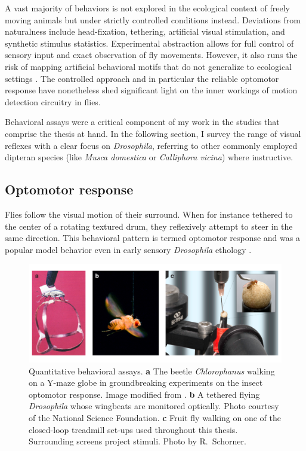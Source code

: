 A vast majority of behaviors is not explored in the ecological context of freely moving animals but under strictly controlled conditions instead. Deviations from naturalness include head-fixation, tethering, artificial visual stimulation, and synthetic stimulus statistics. Experimental abstraction allows for full control of sensory input and exact observation of fly movements. However, it also runs the risk of mapping artificial behavioral motifs that do not generalize to ecological settings \citep{Krakauer:2017aa}. The controlled approach and in particular the reliable optomotor response have nonetheless shed significant light on the inner workings of motion detection circuitry in flies.

Behavioral assays were a critical component of my work in the studies that comprise the thesis at hand. In the following section, I survey the range of visual reflexes with a clear focus on \textit{Drosophila}, referring to other commonly employed dipteran species (like \textit{Musca domestica} or \textit{Calliphora vicina}) where instructive.

\subsection{Optomotor response}
Flies follow the visual motion of their surround. When for instance tethered to the center of a rotating textured drum, they reflexively attempt to steer in the same direction. This behavioral pattern is termed optomotor response and was a popular model behavior even in early sensory \textit{Drosophila} ethology \citep{Hecht:1934aa,Kalmus:1943aa}.

\begin{figure}
    \centering
    \includegraphics[width=1\textwidth]{graphics/figure_setups}
    \caption[Behavioral set-ups for sensory neuroscience]
    {Quantitative behavioral assays. \textbf{a} The beetle \textit{Chlorophanus} walking on a Y-maze globe in groundbreaking experiments on the insect optomotor response. Image modified from \citet{Hassenstein:1991aa}. \textbf{b} A tethered flying \textit{Drosophila} whose wingbeats are monitored optically. Photo courtesy of the National Science Foundation. \textbf{c} Fruit fly walking on one of the closed-loop treadmill set-ups used throughout this thesis. Surrounding screens project stimuli. Photo by R.\ Schorner.}
    \label{fig:setups}
\end{figure}

